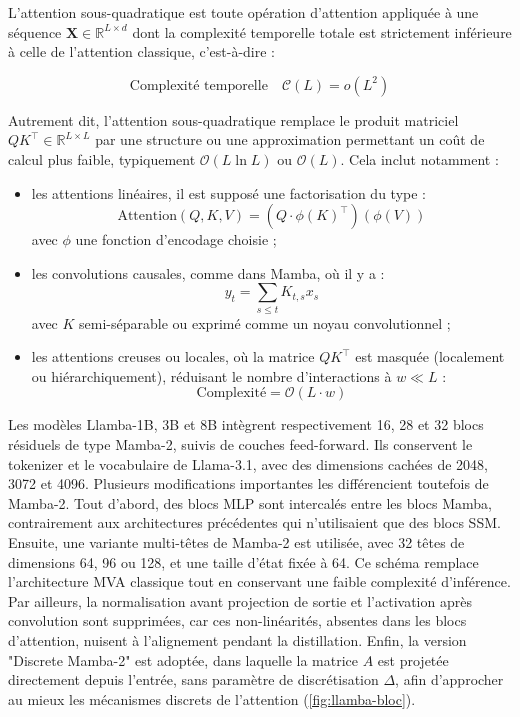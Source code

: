 \begin{definition}
L'attention sous-quadratique est toute opération d'attention appliquée à une séquence $\mathbf{X} \in \mathbb{R}^{L \times d}$ dont la complexité temporelle totale est strictement inférieure à celle de l'attention classique, c’est-à-dire :

\[
\text{Complexité temporelle} \quad \mathcal{C}(L) = o(L^2)
\]

Autrement dit, l'attention sous-quadratique remplace le produit matriciel $QK^\top \in \mathbb{R}^{L \times L}$ par une structure ou une approximation permettant un coût de calcul plus faible, typiquement $\mathcal{O}(L \ln L)$ ou $\mathcal{O}(L)$. Cela inclut notamment :
\begin{itemize}
    \item les attentions linéaires, il est supposé une factorisation du type :
    \[
    \text{Attention}(Q, K, V) = (Q \cdot \phi(K)^\top)(\phi(V))
    \]
    avec $\phi$ une fonction d'encodage choisie ;
    
    \item les convolutions causales, comme dans Mamba, où il y a :
    \[
    y_t = \sum_{s \leq t} K_{t,s} x_s
    \]
    avec $K$ semi-séparable ou exprimé comme un noyau convolutionnel ;
    
    \item les attentions creuses ou locales, où la matrice $QK^\top$ est masquée (localement ou hiérarchiquement), réduisant le nombre d’interactions à $w \ll L$ :
    \[
    \text{Complexité} = \mathcal{O}(L \cdot w)
    \]
\end{itemize}
\end{definition}


Les modèles Llamba-1B, 3B et 8B intègrent respectivement 16, 28 et 32 blocs résiduels de type Mamba-2, suivis de couches feed-forward. Ils conservent le tokenizer et le vocabulaire de Llama-3.1, avec des dimensions cachées de 2048, 3072 et 4096. Plusieurs modifications importantes les différencient toutefois de Mamba-2. Tout d'abord, des blocs MLP sont intercalés entre les blocs Mamba, contrairement aux architectures précédentes qui n’utilisaient que des blocs SSM. Ensuite, une variante multi-têtes de Mamba-2 est utilisée, avec 32 têtes de dimensions 64, 96 ou 128, et une taille d’état fixée à 64. Ce schéma remplace l’architecture MVA classique tout en conservant une faible complexité d’inférence.\\

Par ailleurs, la normalisation avant projection de sortie et l’activation après convolution sont supprimées, car ces non-linéarités, absentes dans les blocs d’attention, nuisent à l’alignement pendant la distillation. Enfin, la version "Discrete Mamba-2" est adoptée, dans laquelle la matrice $A$ est projetée directement depuis l’entrée, sans paramètre de discrétisation $\Delta$, afin d’approcher au mieux les mécanismes discrets de l’attention (\autoref{fig:llamba-bloc}).

